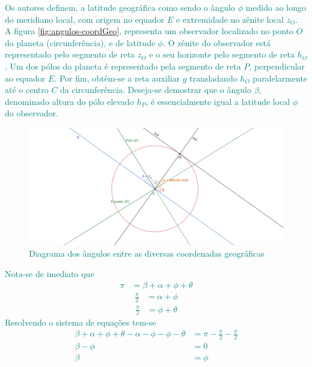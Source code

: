 \begin{sol}
	\textcolor{teal} {
		Os autores \cite{ASTRN&ASTRFIS:2004} definem, a latitude geográfica como sendo o ângulo $\phi$ medido ao longo do meridiano local, com origem no equador $E$ e extremidade no zênite local $z_{O}$.\\				
		A figura \eqref{fig:angulos-coordGeo}, representa um observador localizado no ponto $O$ do planeta (circunferência), e de latitude $\phi$. O zênite do observador está representado pelo segmento de reta $z_{O}$ e o seu horizonte pelo segmento de reta $h_O$. Um dos pólos do planeta é representado pela segmento de reta $P$, perpendicular ao equador $E$. Por fim, obtêm-se a reta auxiliar $g$ transladando $h_O$ paralelarmente até o centro $C$ da circunferência. Deseja-se demostrar que o ângulo $\beta$, denominado altura do pólo elevado $h_P$, é essencialmente igual a latitude local $\phi$ do observador.	
		\begin{figure}[!ht]
			\centering
			\includegraphics[width=\textwidth]{fig/geogebra-export.png}
			\caption{Diagrama dos ângulos entre as diversas coordenadas geográficas}
			\label{fig:angulos-coordGeo}
		\end{figure}
	}
	
	\textcolor{teal} {
		Nota-se de imediato que
		\begin{align}
			\pi&=\beta+\alpha+\phi+\theta
		\end{align}
		\begin{align}
			\frac{\pi}{2}&=\alpha+\phi
		\end{align}
		\begin{align}
			\frac{\pi}{2}&=\phi+\theta
		\end{align}
		Resolvendo o sistema de equações tem-se
		\begin{align}
			\beta+\alpha+\phi+\theta-\alpha-\phi-\phi-\theta&=\pi-\frac{\pi}{2}-\frac{\pi}{2} \nonumber \\
			\beta-\phi&=0 \nonumber \\
			\beta&=\phi
		\end{align}
	}
	
\end{sol}
